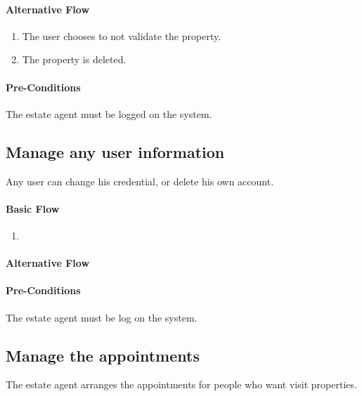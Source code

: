 \documentclass[a4paper,12pt]{article}
\begin{document}
\paragraph{Alternative Flow}
\begin{enumerate}
\item The user chooses to not validate the property.
\item The property is deleted.
\end{enumerate}
\paragraph{Pre-Conditions}
The estate agent must be logged on the system.


\subsection{Manage any user information}

Any user can change his credential, or delete his own account.

\paragraph{Basic Flow}
\begin{enumerate}
\item
\end{enumerate}
\paragraph{Alternative Flow}
\paragraph{Pre-Conditions}
The estate agent must be log on the system.

\subsection{Manage the appointments}

The estate agent arranges the appointments for people who want visit properties.
\end{document}

